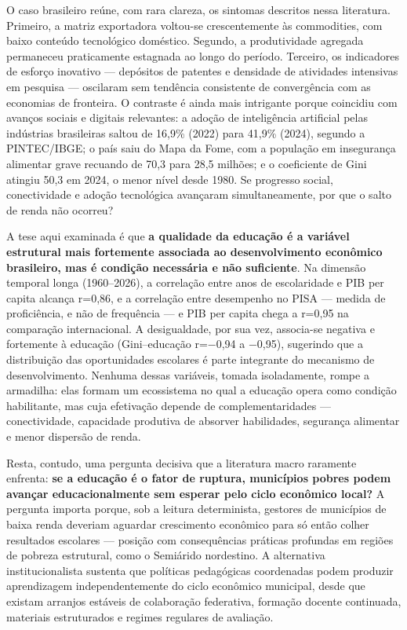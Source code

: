 \documentclass[
  brazilian,
  12pt,
  a4paper,
]{article}
\begin{document}
O caso brasileiro reúne, com rara clareza, os sintomas descritos nessa
literatura. Primeiro, a matriz exportadora voltou-se crescentemente às
commodities, com baixo conteúdo tecnológico doméstico. Segundo, a
produtividade agregada permaneceu praticamente estagnada ao longo do
período. Terceiro, os indicadores de esforço inovativo --- depósitos de
patentes e densidade de atividades intensivas em pesquisa --- oscilaram
sem tendência consistente de convergência com as economias de fronteira.
O contraste é ainda mais intrigante porque coincidiu com avanços sociais
e digitais relevantes: a adoção de inteligência artificial pelas
indústrias brasileiras saltou de 16,9\% (2022) para 41,9\% (2024),
segundo a PINTEC/IBGE; o país saiu do Mapa da Fome, com a população em
insegurança alimentar grave recuando de 70,3 para 28,5 milhões; e o
coeficiente de Gini atingiu 50,3 em 2024, o menor nível desde 1980. Se
progresso social, conectividade e adoção tecnológica avançaram
simultaneamente, por que o salto de renda não ocorreu?

A tese aqui examinada é que \textbf{a qualidade da educação é a variável
estrutural mais fortemente associada ao desenvolvimento econômico
brasileiro, mas é condição necessária e não suficiente}. Na dimensão
temporal longa (1960--2026), a correlação entre anos de escolaridade e
PIB per capita alcança r=0,86, e a correlação entre desempenho no PISA
--- medida de proficiência, e não de frequência --- e PIB per capita
chega a r=0,95 na comparação internacional. A desigualdade, por sua vez,
associa-se negativa e fortemente à educação (Gini--educação r=−0,94 a
−0,95), sugerindo que a distribuição das oportunidades escolares é parte
integrante do mecanismo de desenvolvimento. Nenhuma dessas variáveis,
tomada isoladamente, rompe a armadilha: elas formam um ecossistema no
qual a educação opera como condição habilitante, mas cuja efetivação
depende de complementaridades --- conectividade, capacidade produtiva de
absorver habilidades, segurança alimentar e menor dispersão de renda.

Resta, contudo, uma pergunta decisiva que a literatura macro raramente
enfrenta: \textbf{se a educação é o fator de ruptura, municípios pobres
podem avançar educacionalmente sem esperar pelo ciclo econômico local?}
A pergunta importa porque, sob a leitura determinista, gestores de
municípios de baixa renda deveriam aguardar crescimento econômico para
só então colher resultados escolares --- posição com consequências
práticas profundas em regiões de pobreza estrutural, como o Semiárido
nordestino. A alternativa institucionalista sustenta que políticas
pedagógicas coordenadas podem produzir aprendizagem independentemente do
ciclo econômico municipal, desde que existam arranjos estáveis de
colaboração federativa, formação docente continuada, materiais
estruturados e regimes regulares de avaliação.
\end{document}
